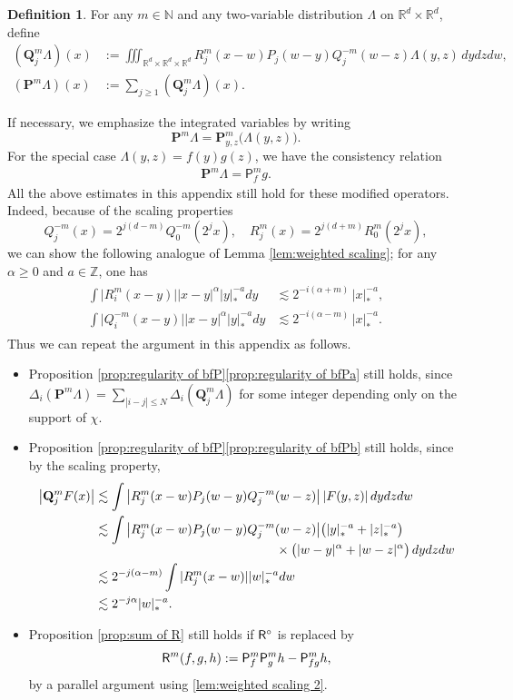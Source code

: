 \documentclass[JEP,XML,SOM,Unicode,published]{cedram}
\theoremstyle{plain}
\theoremstyle{definition}
\newtheorem{defn}[thm]{Definition}
\newcommand{\bfP}{\mathbf{P}}
\newcommand{\bfQ}{\mathbf{Q}}
\newcommand{\sfP}{\mathsf{P}}
\newcommand{\bbN}{\mathbb{N}}
\newcommand{\bbR}{\mathbb{R}}
\newcommand{\bbZ}{\mathbb{Z}}
\begin{document}
\begin{defn}
For any $m\in\bbN$ and any two-variable distribution $\Lambda$ on $\bbR^d\times\bbR^d$, define
\begin{align*}
(\bfQ_j^m \Lambda)(x) &:= \iiint_{\bbR^d\times\bbR^d\times\bbR^d} R_j^m(x-w)P_j(w-y)Q_j^{-m}(w-z) \Lambda(y,z)\,dydzdw, \\
(\bfP^m \Lambda)(x) &:= \sum_{j\ge1}(\bfQ_j^m\Lambda)(x).
\end{align*}
\end{defn}

If necessary, we emphasize the integrated variables by writing
\[
\bfP^m\Lambda =\bfP_{y,z}^m\bigl(\Lambda(y,z)\bigr).
\]
For the special case $\Lambda(y,z)=f(y)g(z)$, we have the consistency relation
\begin{align*}
\bfP^m\Lambda = {\sfP}^m_fg.
\end{align*}
All the above estimates in this appendix still hold for these modified operators. Indeed, because of the scaling properties
\[
Q_j^{-m}(x)=2^{j(d-m)}Q_0^{-m}(2^jx),\quad
R_j^m(x)=2^{j(d+m)}R_0^m(2^jx),
\]
we can show the following analogue of Lemma \ref{lem:weighted scaling}; for any $\alpha\ge0$ and $a\in\bbZ$, one has
\begin{align}\label{lem:weighted scaling 2}
\begin{aligned}
\int \big|R_i^m(x-y)\big| |x-y|^\alpha|y|_*^{-a}dy&\lesssim2^{-i(\alpha+m)}\,|x|_*^{-a}, \\
\int \big|Q_i^{-m}(x-y)\big| |x-y|^\alpha|y|_*^{-a}dy&\lesssim2^{-i(\alpha-m)}\,|x|_*^{-a}.
\end{aligned}
\end{align}
Thus we can repeat the argument in this appendix as follows.
\begin{itemize}
\item Proposition \ref{prop:regularity of bfP}\eqref{prop:regularity of bfPa} still holds, since $\Delta_i(\bfP^m\Lambda)=\sum_{|i-j|\le N}\Delta_i(\bfQ_j^m\Lambda)$ for some integer depending only on the support of $\chi$.
\item Proposition \ref{prop:regularity of bfP}\eqref{prop:regularity of bfPb} still holds, since by the scaling property,
\begin{align*}
\big|\bfQ_j^mF(x)\big| &\lesssim \int \big|R_j^m(x-w)P_j(w-y)Q_j^{-m}(w-z)\big| \,|F(y,z)|\, dydzdw \\
&\lesssim \int \big|R_j^m(x-w)P_j(w-y)Q_j^{-m}(w-z)\big| \bigl(|y|_*^{-a}+|z|_*^{-a}\bigr)\\[-5pt]
& \hspace*{5cm}\times\bigl(|w-y|^\alpha+|w-z|^\alpha\bigr) \,dydzdw \\
&\lesssim 2^{-j(\alpha-m)}\int |R_j^m(x-w)| |w|_*^{-a}dw\\
&\lesssim 2^{-j\alpha}|w|_*^{-a}.
\end{align*}

\item Proposition \ref{prop:sum of R} still holds if ${\sf R}^{\circ}$ is replaced by
\[
{\sf R}^m(f,g,h):={\sf P}_f^m{\sf P}^m_gh-{\sf P}^m_{fg}h,
\]
by a parallel argument using \eqref{lem:weighted scaling 2}.
\end{itemize}
\end{document}
